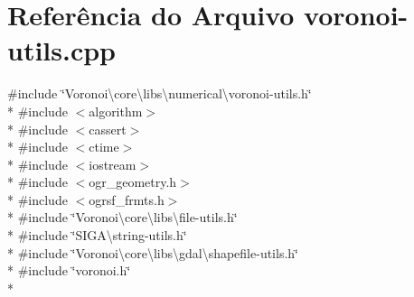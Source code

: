 \section{Referência do Arquivo voronoi-\/utils.cpp}
\label{voronoi-utils_8cpp}
{\ttfamily \#include \char`\"{}Voronoi\textbackslash{}core\textbackslash{}libs\textbackslash{}numerical\textbackslash{}voronoi-\/utils.\+h\char`\"{}}\\*
{\ttfamily \#include $<$algorithm$>$}\\*
{\ttfamily \#include $<$cassert$>$}\\*
{\ttfamily \#include $<$ctime$>$}\\*
{\ttfamily \#include $<$iostream$>$}\\*
{\ttfamily \#include $<$ogr\+\_\+geometry.\+h$>$}\\*
{\ttfamily \#include $<$ogrsf\+\_\+frmts.\+h$>$}\\*
{\ttfamily \#include \char`\"{}Voronoi\textbackslash{}core\textbackslash{}libs\textbackslash{}file-\/utils.\+h\char`\"{}}\\*
{\ttfamily \#include \char`\"{}S\+I\+G\+A\textbackslash{}string-\/utils.\+h\char`\"{}}\\*
{\ttfamily \#include \char`\"{}Voronoi\textbackslash{}core\textbackslash{}libs\textbackslash{}gdal\textbackslash{}shapefile-\/utils.\+h\char`\"{}}\\*
{\ttfamily \#include \char`\"{}voronoi.\+h\char`\"{}}\\*
